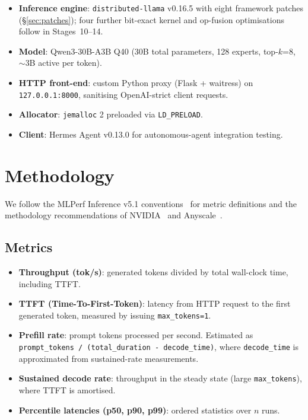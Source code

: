 \documentclass[10pt,a4paper]{article}
\begin{document}
\begin{itemize}
  \item \textbf{Inference engine}: \texttt{distributed-llama} v0.16.5 with eight framework patches (\S\ref{sec:patches}); four further bit-exact kernel and op-fusion optimisations follow in Stages~10--14.
  \item \textbf{Model}: Qwen3-30B-A3B Q40 (30B total parameters, 128 experts, top-$k$=8, $\sim$3B active per token).
  \item \textbf{HTTP front-end}: custom Python proxy (Flask + waitress) on \texttt{127.0.0.1:8000}, sanitising OpenAI-strict client requests.
  \item \textbf{Allocator}: \texttt{jemalloc} 2 preloaded via \texttt{LD\_PRELOAD}.
  \item \textbf{Client}: Hermes Agent v0.13.0 for autonomous-agent integration testing.
\end{itemize}

\section{Methodology}

We follow the MLPerf Inference v5.1 conventions~\cite{mlperf2025} for metric definitions and the methodology recommendations of NVIDIA~\cite{nvidia2024metrics} and Anyscale~\cite{anyscale2024metrics}.

\subsection{Metrics}

\begin{itemize}
  \item \textbf{Throughput (tok/s)}: generated tokens divided by total wall-clock time, including TTFT.
  \item \textbf{TTFT (Time-To-First-Token)}: latency from HTTP request to the first generated token, measured by issuing \texttt{max\_tokens=1}.
  \item \textbf{Prefill rate}: prompt tokens processed per second. Estimated as \texttt{prompt\_tokens / (total\_duration - decode\_time)}, where \texttt{decode\_time} is approximated from sustained-rate measurements.
  \item \textbf{Sustained decode rate}: throughput in the steady state (large \texttt{max\_tokens}), where TTFT is amortised.
  \item \textbf{Percentile latencies (p50, p90, p99)}: ordered statistics over $n$ runs.
\end{itemize}
\end{document}

